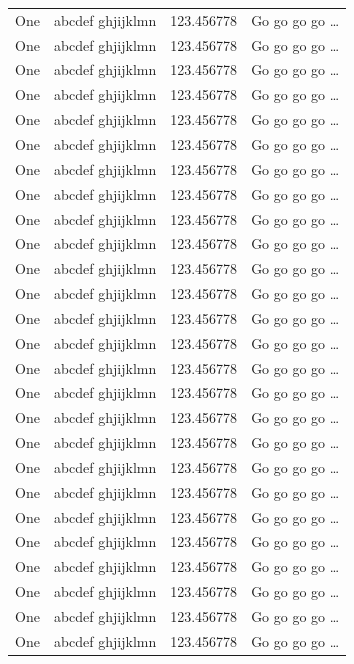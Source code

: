 \documentclass[phd,showframe]{ndsu-thesis-2022}
\begin{document}
\begin{longtable}{l l l l}
One & abcdef ghjijklmn & 123.456778  & Go go go go \ldots \\
One & abcdef ghjijklmn & 123.456778  & Go go go go \ldots \\
One & abcdef ghjijklmn & 123.456778  & Go go go go \ldots \\
One & abcdef ghjijklmn & 123.456778  & Go go go go \ldots \\
One & abcdef ghjijklmn & 123.456778  & Go go go go \ldots \\
One & abcdef ghjijklmn & 123.456778  & Go go go go \ldots \\
One & abcdef ghjijklmn & 123.456778  & Go go go go \ldots \\
One & abcdef ghjijklmn & 123.456778  & Go go go go \ldots \\
One & abcdef ghjijklmn & 123.456778  & Go go go go \ldots \\
One & abcdef ghjijklmn & 123.456778  & Go go go go \ldots \\
One & abcdef ghjijklmn & 123.456778  & Go go go go \ldots \\
One & abcdef ghjijklmn & 123.456778  & Go go go go \ldots \\
One & abcdef ghjijklmn & 123.456778  & Go go go go \ldots \\
One & abcdef ghjijklmn & 123.456778  & Go go go go \ldots \\
One & abcdef ghjijklmn & 123.456778  & Go go go go \ldots \\
One & abcdef ghjijklmn & 123.456778  & Go go go go \ldots \\
One & abcdef ghjijklmn & 123.456778  & Go go go go \ldots \\
One & abcdef ghjijklmn & 123.456778  & Go go go go \ldots \\
One & abcdef ghjijklmn & 123.456778  & Go go go go \ldots \\
One & abcdef ghjijklmn & 123.456778  & Go go go go \ldots \\
One & abcdef ghjijklmn & 123.456778  & Go go go go \ldots \\
One & abcdef ghjijklmn & 123.456778  & Go go go go \ldots \\
One & abcdef ghjijklmn & 123.456778  & Go go go go \ldots \\
One & abcdef ghjijklmn & 123.456778  & Go go go go \ldots \\
One & abcdef ghjijklmn & 123.456778  & Go go go go \ldots \\
One & abcdef ghjijklmn & 123.456778  & Go go go go \ldots \\

\end{longtable}
\end{document}

